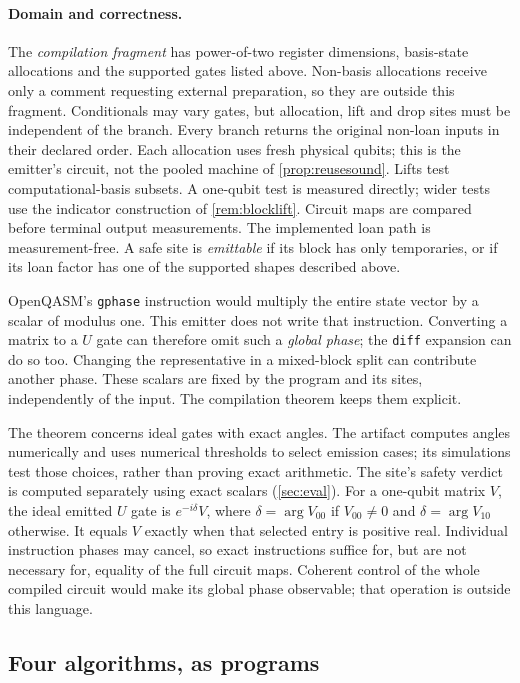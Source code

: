 \documentclass[acmsmall,screen,review,anonymous,nonacm]{acmart}
\begin{document}
\paragraph{Domain and correctness.}
The \emph{compilation fragment} has power-of-two register dimensions,
basis-state allocations and the supported gates listed above.
Non-basis allocations receive only a comment requesting external
preparation, so they are outside this fragment. Conditionals may vary
gates, but allocation, lift and drop sites must be independent of the
branch. Every branch returns the original non-loan inputs in their
declared order. Each allocation uses fresh physical qubits; this is the
emitter's circuit, not the pooled machine of \cref{prop:reusesound}.
Lifts test computational-basis subsets. A one-qubit test is measured
directly; wider tests use the indicator construction of \cref{rem:blocklift}.
Circuit maps are compared before terminal output measurements.
The implemented loan path is measurement-free.
A safe site is \emph{emittable} if its block has only temporaries, or if
its loan factor has one of the supported shapes described above.

OpenQASM's \texttt{gphase} instruction would multiply the entire state
vector by a scalar of modulus one. This emitter does not write that
instruction. Converting a matrix to a $U$ gate can therefore omit such a
\emph{global phase}; the \texttt{diff} expansion can do so too.
Changing the representative in a mixed-block split can contribute another
phase. These scalars are fixed by the program and its sites, independently
of the input. The compilation theorem keeps them explicit.

\stmtCompile

The theorem concerns ideal gates with exact angles. The artifact computes
angles numerically and uses numerical thresholds to select emission cases;
its simulations test those choices, rather than proving exact arithmetic.
The site's safety verdict is computed separately using exact scalars
(\cref{sec:eval}). For a one-qubit matrix $V$, the ideal emitted $U$ gate
is $e^{-i\delta}V$, where $\delta=\arg V_{00}$ if $V_{00}\ne0$ and
$\delta=\arg V_{10}$ otherwise. It equals $V$ exactly when that selected
entry is positive real. Individual instruction phases may cancel, so exact
instructions suffice for, but are not necessary for, equality of the full
circuit maps. Coherent control of the whole compiled circuit would make
its global phase observable; that operation is outside this language.

\subsection{Four algorithms, as programs}\label{sec:lang:algorithms}
\end{document}
